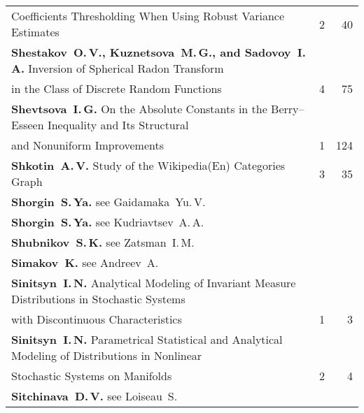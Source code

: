 {\begin{tabular}{p{397pt}rr}
\hspace*{23pt}Coefficients Thresholding When Using Robust Variance Estimates\dotfill&2&40\\
\textbf{Shestakov~O.\,V., Kuznetsova~M.\,G., and Sadovoy~I.\,A.}
Inversion of Spherical Radon Transform\linebreak
\vspace*{-12pt}\\
\hspace*{23pt}in the Class of Discrete Random Functions\dotfill&4&75\\
\textbf{Shevtsova~I.\,G.}
On the Absolute Constants in the Berry--Esseen Inequality and Its Structural\linebreak
\vspace*{-12pt}\\
\hspace*{23pt}and Nonuniform Improvements\dotfill&1&124\\
\textbf{Shkotin~A.\,V.}
Study of the Wikipedia(En) Categories Graph\dotfill&3&35\\
\textbf{Shorgin~S.\,Ya.} see Gaidamaka~Yu.\,V.&&\\
\textbf{Shorgin~S.\,Ya.} see Kudriavtsev~A.\,A.&&\\
\textbf{Shubnikov~S.\,K.} see Zatsman~I.\,M.&&\\
\textbf{Simakov~K.} see Andreev~A.&&\\
\textbf{Sinitsyn~I.\,N.}
Analytical Modeling of Invariant Measure Distributions in Stochastic Systems\linebreak
\vspace*{-12pt}\\
\hspace*{23pt}with Discontinuous Characteristics\dotfill&1&3\\
\textbf{Sinitsyn~I.\,N.}
Parametrical Statistical and Analytical Modeling of Distributions in Nonlinear\linebreak
\vspace*{-12pt}\\
\hspace*{23pt}Stochastic Systems on Manifolds\dotfill&2&4\\
\textbf{Sitchinava~D.\,V.} see Loiseau~S.&&\\
\end{tabular}
}
\pagebreak

\def\leftkol{2013 AUTHOR INDEX} %

\def\rightkol{2013 AUTHOR INDEX} %


